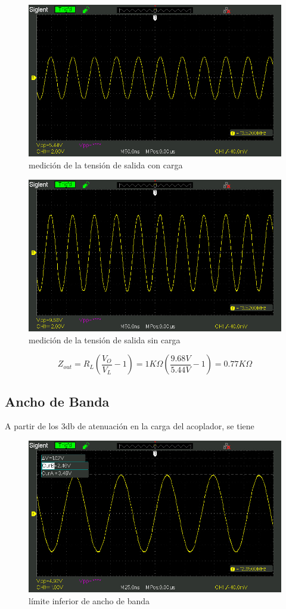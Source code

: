\begin{figure}[H]
    \centering
    \includegraphics[width=0.5\linewidth]{oscilo/SDS00018.jpg}
    \caption{medición de la tensión de salida con carga}
    \label{fig:enter-label}
\end{figure}

\begin{figure}[H]
    \centering
    \includegraphics[width=0.5\linewidth]{oscilo/SDS00017.jpg}
    \caption{medición de la tensión de salida sin carga}
    \label{fig:enter-label}
\end{figure}


$$
Z_{out} = R_L(\frac{V_O}{V_L}-1)= 1K\Omega(\frac{9.68V}{5.44V}-1)=0.77K\Omega
$$

\subsection{Ancho de Banda}
A partir de los 3db de atenuación en la carga del acoplador, se tiene

\begin{figure}[H]
    \centering
    \includegraphics[width=0.5\linewidth]{oscilo/SDS00021.jpg}
    \caption{límite inferior de ancho de banda}
    \label{fig:enter-label}
\end{figure}

